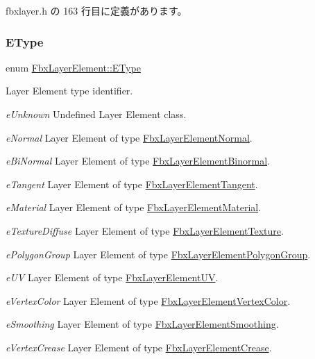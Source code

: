  fbxlayer.\+h の 163 行目に定義があります。

\mbox{\label{class_fbx_layer_element_a8c95c5cd880b56c776acd379bd86f42c}} 
\subsubsection{\texorpdfstring{E\+Type}{EType}}
{\footnotesize\ttfamily enum \hyperlink{class_fbx_layer_element_a8c95c5cd880b56c776acd379bd86f42c}{Fbx\+Layer\+Element\+::\+E\+Type}}

Layer Element type identifier.
\begin{DoxyItemize}
\item {\itshape e\+Unknown} Undefined Layer Element class.
\item {\itshape e\+Normal} Layer Element of type \hyperlink{class_fbx_layer_element_normal}{Fbx\+Layer\+Element\+Normal}.
\item {\itshape e\+Bi\+Normal} Layer Element of type \hyperlink{class_fbx_layer_element_binormal}{Fbx\+Layer\+Element\+Binormal}.
\item {\itshape e\+Tangent} Layer Element of type \hyperlink{class_fbx_layer_element_tangent}{Fbx\+Layer\+Element\+Tangent}.
\item {\itshape e\+Material} Layer Element of type \hyperlink{class_fbx_layer_element_material}{Fbx\+Layer\+Element\+Material}.
\item {\itshape e\+Texture\+Diffuse} Layer Element of type \hyperlink{class_fbx_layer_element_texture}{Fbx\+Layer\+Element\+Texture}.
\item {\itshape e\+Polygon\+Group} Layer Element of type \hyperlink{class_fbx_layer_element_polygon_group}{Fbx\+Layer\+Element\+Polygon\+Group}.
\item {\itshape e\+UV} Layer Element of type \hyperlink{class_fbx_layer_element_u_v}{Fbx\+Layer\+Element\+UV}.
\item {\itshape e\+Vertex\+Color} Layer Element of type \hyperlink{class_fbx_layer_element_vertex_color}{Fbx\+Layer\+Element\+Vertex\+Color}.
\item {\itshape e\+Smoothing} Layer Element of type \hyperlink{class_fbx_layer_element_smoothing}{Fbx\+Layer\+Element\+Smoothing}.
\item {\itshape e\+Vertex\+Crease} Layer Element of type \hyperlink{class_fbx_layer_element_crease}{Fbx\+Layer\+Element\+Crease}.

\end{DoxyItemize}
